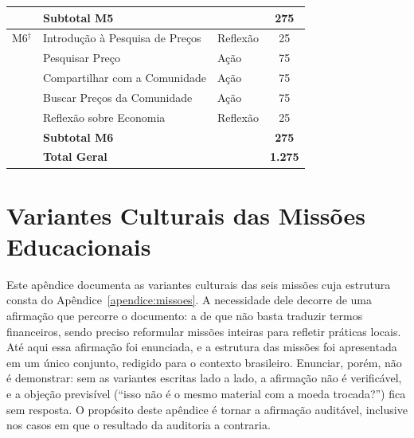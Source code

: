 \begin{longtable}{cllc}
\hline
   & \textbf{Subtotal M5} & & \textbf{275} \\
\hline
M6$^{\dagger}$ & Introdução à Pesquisa de Preços & Reflexão & 25 \\
   & Pesquisar Preço & Ação & 75 \\
   & Compartilhar com a Comunidade & Ação & 75 \\
   & Buscar Preços da Comunidade & Ação & 75 \\
   & Reflexão sobre Economia & Reflexão & 25 \\
\hline
   & \textbf{Subtotal M6} & & \textbf{275} \\
\hline
   & \textbf{Total Geral} & & \textbf{1.275\footnotemark} \\
\end{longtable}




\chapter{Variantes Culturais das Missões Educacionais}
\label{apendice:variantes}

Este apêndice documenta as variantes culturais das seis missões cuja estrutura consta do Apêndice~\ref{apendice:missoes}. A necessidade dele decorre de uma afirmação que percorre o documento: a de que não basta traduzir termos financeiros, sendo preciso reformular missões inteiras para refletir práticas locais. Até aqui essa afirmação foi enunciada, e a estrutura das missões foi apresentada em um único conjunto, redigido para o contexto brasileiro. Enunciar, porém, não é demonstrar: sem as variantes escritas lado a lado, a afirmação não é verificável, e a objeção previsível (``isso não é o mesmo material com a moeda trocada?'') fica sem resposta. O propósito deste apêndice é tornar a afirmação auditável, inclusive nos casos em que o resultado da auditoria a contraria.

